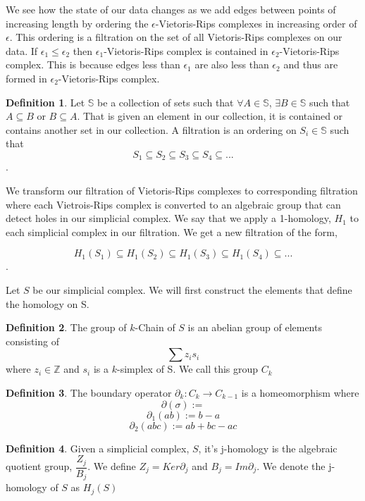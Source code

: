 \documentclass[12pt, a4paper, twocolumn, fullpage]{article}
\theoremstyle{plain}
\theoremstyle{definition}
\newtheorem{defn}{Definition}[section]
\theoremstyle{remark}
\begin{document}
We see how the state of our data changes as we add edges between points of increasing length by ordering the $\epsilon$-Vietoris-Rips complexes in increasing order of $\epsilon$. This ordering is a filtration on the set of all Vietoris-Rips complexes on our data. If $\epsilon_1 \leq \epsilon_2$ then $\epsilon_1$-Vietoris-Rips complex is contained in  $\epsilon_2$-Vietoris-Rips complex. This is because edges less than $\epsilon_1$ are also less than $\epsilon_2$ and thus are formed in  $\epsilon_2$-Vietoris-Rips complex.

\begin{defn}
Let $\mathbb{S}$ be a collection of sets such that $\forall A \in \mathbb{S}$, $\exists B \in \mathbb{S}$ such that $A \subseteq B$ or $B \subseteq A$. That is given an element in our collection, it is contained or contains another set in our collection. 
A filtration is an ordering on $S_i \in \mathbb{S}$ such that
$$S_1 \subseteq S_2 \subseteq S_3 \subseteq S_4 \subseteq ...$$.
\end{defn}
 
We transform our filtration of Vietoris-Rips complexes to corresponding filtration where each Vietrois-Rips complex is converted to an algebraic group that can detect holes in our simplicial complex. We say that we apply a 1-homology, $H_1$ to each simplicial complex in our filtration. We get a new filtration of the form,

$$ H_1(S_1) \subseteq H_1(S_2) \subseteq H_1(S_3) \subseteq H_1(S_4) \subseteq ...$$.

Let $S$ be our simplicial complex. We will first construct the elements that define the homology on S.
\begin{defn}
The group of $k$-Chain of $S$ is an abelian group of elements consisting of 
$$\sum z_i s_i $$ where $z_i \in \mathbb{Z}$ and $s_i$ is a $k$-simplex of S.
We call this group $C_k$
\end{defn}

\begin{defn}
The boundary operator $\partial_k : C_k \rightarrow C_{k-1}$ is a homeomorphism where
$$\partial (\sigma) := $$ %
$$\partial_1 (ab) := b-a$$
$$\partial_2 (abc) := ab+bc-ac$$
\end{defn}

\begin{defn}
Given a simplicial complex, $S$, it's j-homology is the algebraic quotient group, $\dfrac{Z_j}{B_j}$.
We define $Z_j = Ker \partial _j$ and $B_j = Im \partial_j$.
We denote the j-homology of $S$ as $H_j(S)$
\end{defn}
 
\end{document}
